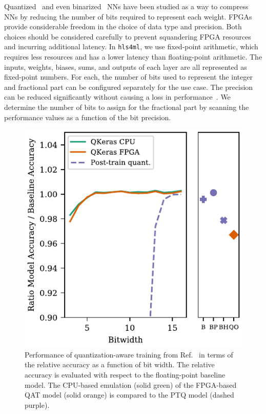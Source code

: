 \documentclass[tinyml]{acmart}
\newcommand{\hlsfml}{\texttt{hls4ml}\xspace}
\renewcommand{\vec}[1]{\boldsymbol{#1}}
\begin{document}
Quantized~\cite{DBLP:journals/corr/GongLYB14,wu2016quantized,37631,DBLP:journals/corr/GuptaAGN15,DBLP:journals/corr/HanMD15,JMLR:v18:16-456} and even binarized~\cite{NIPS2015_5647,NIPS2016_6573,DBLP:journals/corr/RastegariORF16,DBLP:journals/corr/MerollaAAEM16,DBLP:journals/corr/GuptaAGN15,DiGuglielmo:2020eqx} NNs have been studied as a way to compress NNs by reducing the number of bits required to represent each weight.
FPGAs provide considerable freedom in the choice of data type and precision.
Both choices should be considered carefully to prevent squandering FPGA resources and incurring additional latency.
In \hlsfml, we use fixed-point arithmetic, which requires less resources and has a lower latency than floating-point arithmetic.
The inputs, weights, biases, sums, and outputs of each layer are all represented as fixed-point numbers.
For each, the number of bits used to represent the integer and fractional part can be configured separately for the use case.
The precision can be reduced significantly without causing a loss in performance~\cite{DBLP:journals/corr/GuptaAGN15}.
We determine the number of bits to assign for the fractional part by scanning the performance values as a function of the bit precision.

\begin{figure}[t!]
\centering
\includegraphics[width=0.6\columnwidth]{Figs/accuracy-2.pdf}
\caption{Performance of quantization-aware training from Ref.~\cite{Coelho:2020zfu} in terms of the relative accuracy as a function of bit width.
The relative accuracy is evaluated with respect to the floating-point baseline model.
The CPU-based emulation (solid green) of the FPGA-based QAT model (solid orange) is compared to the PTQ model (dashed purple). }
\label{fig:qat}
\end{figure}
\end{document}
